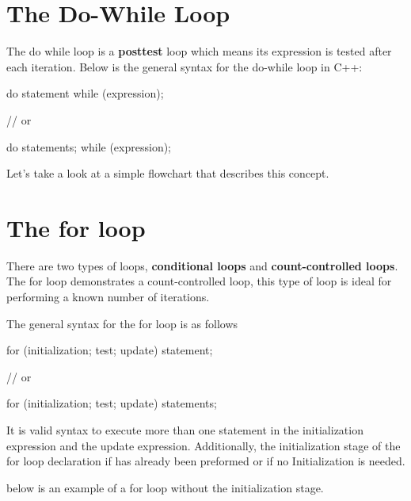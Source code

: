\documentclass{report}
\begin{document}
    \pagebreak \bigbreak \noindent 
    \section{\LARGE The Do-While Loop}
    \bigbreak \noindent 
    \begin{concept}
 The do while loop is a \textbf{posttest} loop which means its expression is tested after each iteration. Below is the general syntax for the do-while loop in C++:
	\end{concept}
    \bigbreak \noindent 
    
    \begin{cppcode}
do 
    statement
while (expression);

// or 

do {
    statements;
} while (expression);
    \end{cppcode}
    
    \bigbreak \noindent 
    \begin{minipage}[]{0.47\textwidth}
        Let's take a look at a simple flowchart that describes this concept.
    
    \end{minipage}
    \begin{minipage}[]{0.47\textwidth}
    \end{minipage}

    \pagebreak \bigbreak \noindent 
    \section{\LARGE The for loop}
    \bigbreak \noindent 
    \begin{concept}
 There are two types of loops, \textbf{conditional loops} and \textbf{count-controlled loops}. The for loop demonstrates a count-controlled loop, this type of loop is ideal for performing a known number of iterations.
	\end{concept}
    \bigbreak \noindent 
    The general syntax for the for loop is as follows
    \bigbreak \noindent 
    
    \begin{cppcode}
for (initialization; test; update)  
    statement;

// or

for (initialization; test; update) { 
    statements;
}
    \end{cppcode}
    

    \bigbreak \noindent 
    \begin{notebox}
			It is valid syntax to execute more than one statement in the initialization expression and the update expression. Additionally, the initialization stage of the for loop declaration if has already been preformed or if no Initialization is needed.
		\end{notebox}
    \bigbreak \noindent 
    below is an example of a for loop without the initialization stage.
    \bigbreak \noindent 
    
\end{document}
